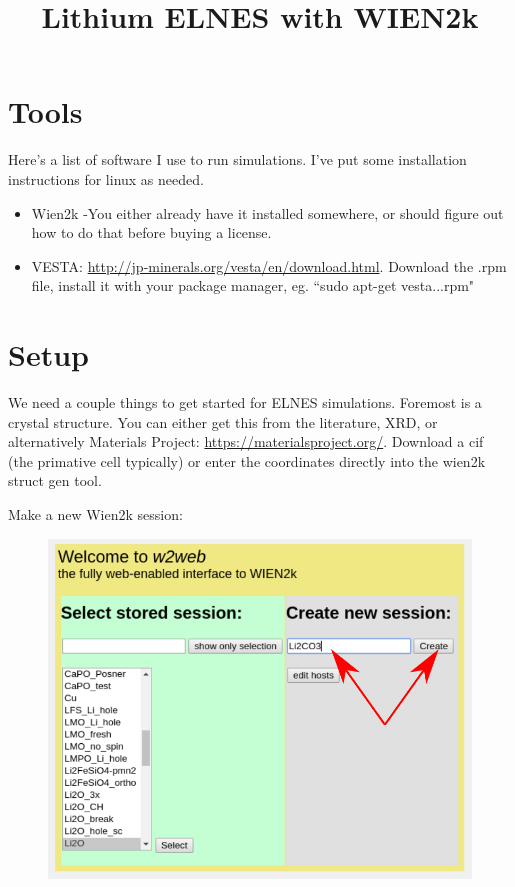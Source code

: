 \documentclass[12pt]{article}
\title{Lithium ELNES with WIEN2k}
\begin{document}
\maketitle


\section{Tools}	
Here's a list of software I use to run simulations.  I've put some installation instructions for linux as needed.  

\begin{itemize}
	\item Wien2k  -You either already have it installed somewhere, or should figure out how to do that before buying a license.  
	
	\item  VESTA: \url{http://jp-minerals.org/vesta/en/download.html}.  Download the .rpm file, install it with your package manager, eg. ``sudo apt-get vesta...rpm"
	
\end{itemize}
	
\section{Setup}	

We need a couple things to get started for ELNES simulations.  Foremost is a crystal structure.  You can either get this from the literature, XRD, or alternatively Materials Project: \url{https://materialsproject.org/}.  Download a cif (the primative cell typically) or enter the coordinates directly into the wien2k struct gen tool.  

Make a new Wien2k session: 
\begin{figure}[H]
\includegraphics[scale=0.3]{./images/new_session.png}
\end{figure}
\end{document}
